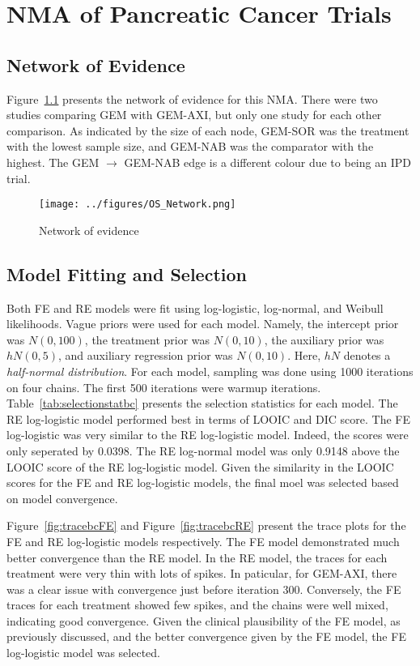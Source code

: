 \chapter{NMA of Pancreatic Cancer Trials}\label{nmachap}

\section{Network of Evidence}
Figure~\ref{fig:osnet} presents the network of evidence for this NMA. There were two studies comparing GEM with GEM-AXI, but only one study for each other comparison. As indicated by the size of each node, GEM-SOR was the treatment with the lowest sample size, and GEM-NAB was the comparator with the highest. The GEM $\to$ GEM-NAB edge is a different colour due to being an IPD trial. 

\begin{figure}[h]
    \centering
    \texttt{[image: ../figures/OS\_Network.png]}
    \caption{Network of evidence}
    \label{fig:osnet}
\end{figure}

\section{Model Fitting and Selection}
Both FE and RE models were fit using log-logistic, log-normal, and Weibull likelihoods. Vague priors were used for each model. Namely, the intercept prior was $N(0, 100)$, the treatment prior was $N(0, 10)$, the auxiliary prior was $hN(0, 5)$, and auxiliary regression prior was $N(0, 10)$. Here, $hN$ denotes a \textit{half-normal distribution}. For each model, sampling was done using 1000 iterations on four chains. The first 500 iterations were warmup iterations. \\

Table~\ref{tab:selectionstatbc} presents the selection statistics for each model. The RE log-logistic model performed best in terms of LOOIC and DIC score. The FE log-logistic was very similar to the RE log-logistic model. Indeed, the scores were only seperated by 0.0398. The RE log-normal model was only 0.9148 above the LOOIC score of the RE log-logistic model. Given the similarity in the LOOIC scores for the FE and RE log-logistic models, the final moel was selected based on model convergence.

Figure~\ref{fig:tracebcFE} and Figure~\ref{fig:tracebcRE} present the trace plots for the FE and RE log-logistic models respectively. The FE model demonstrated much better convergence than the RE model. In the RE model, the traces for each treatment were very thin with lots of spikes. In paticular, for GEM-AXI, there was a clear issue with convergence just before iteration 300. Conversely, the FE traces for each treatment showed few spikes, and the chains were well mixed, indicating good convergence. Given the clinical plausibility of the FE model, as previously discussed, and the better convergence given by the FE model, the FE log-logistic model was selected.

